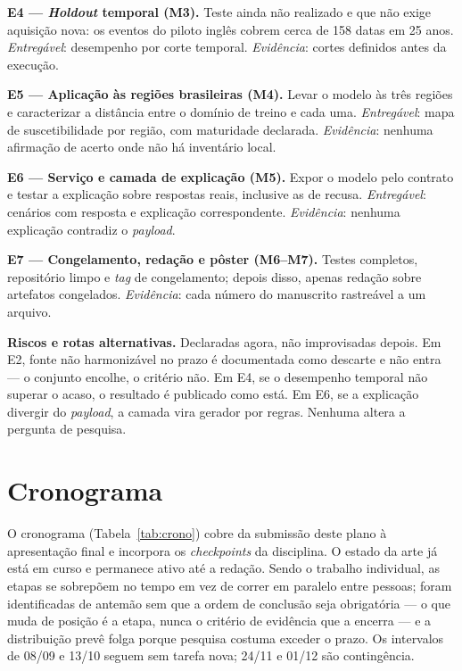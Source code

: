 \documentclass[conference]{IEEEtran}
\begin{document}
\textbf{E4 --- \emph{Holdout} temporal (M3).} Teste ainda não realizado e que não
exige aquisição nova: os eventos do piloto inglês cobrem cerca de 158 datas em 25
anos. \emph{Entregável}: desempenho por corte temporal. \emph{Evidência}: cortes
definidos antes da execução.

\textbf{E5 --- Aplicação às regiões brasileiras (M4).} Levar o modelo às três
regiões e caracterizar a distância entre o domínio de treino e cada uma.
\emph{Entregável}: mapa de suscetibilidade por região, com maturidade declarada.
\emph{Evidência}: nenhuma afirmação de acerto onde não há inventário local.

\textbf{E6 --- Serviço e camada de explicação (M5).} Expor o modelo pelo contrato
e testar a explicação sobre respostas reais, inclusive as de recusa.
\emph{Entregável}: cenários com resposta e explicação correspondente.
\emph{Evidência}: nenhuma explicação contradiz o \emph{payload}.

\textbf{E7 --- Congelamento, redação e pôster (M6--M7).} Testes completos,
repositório limpo e \emph{tag} de congelamento; depois disso, apenas redação
sobre artefatos congelados. \emph{Evidência}: cada número do manuscrito
rastreável a um arquivo.

\textbf{Riscos e rotas alternativas.} Declaradas agora, não improvisadas depois.
Em E2, fonte não harmonizável no prazo é documentada como descarte e não entra ---
o conjunto encolhe, o critério não. Em E4, se o desempenho temporal não superar o
acaso, o resultado é publicado como está. Em E6, se a explicação divergir do
\emph{payload}, a camada vira gerador por regras. Nenhuma altera a pergunta de
pesquisa.

\section{Cronograma}
\label{sec:crono}

O cronograma (Tabela~\ref{tab:crono}) cobre da submissão deste plano à
apresentação final e incorpora os \emph{checkpoints} da disciplina. O estado da
arte já está em curso e permanece ativo até a redação. Sendo o trabalho
individual, as etapas se sobrepõem no tempo em vez de correr em paralelo entre
pessoas; foram identificadas de antemão sem que a ordem de conclusão seja
obrigatória --- o que muda de posição é a etapa, nunca o critério de evidência
que a encerra --- e a distribuição prevê folga porque pesquisa costuma exceder o
prazo. Os intervalos de 08/09 e 13/10 seguem sem tarefa nova; 24/11 e 01/12 são
contingência.
\end{document}
